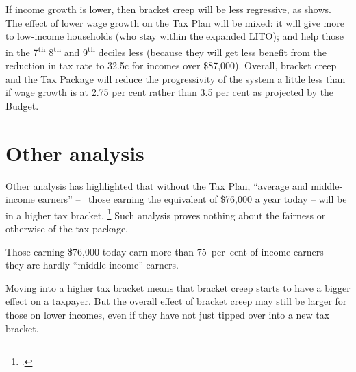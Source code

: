 \documentclass[submission]{grattan}
\begin{document}
If income growth is lower, then bracket creep will be less regressive, as  shows. The effect of lower wage growth on the Tax Plan will be mixed: it will give more to low-income households (who stay within the expanded LITO); and help those in the 7\textsuperscript{th} 8\textsuperscript{th} and 9\textsuperscript{th} deciles less (because they will get less benefit from the reduction in tax rate to 32.5c for incomes over \$87,000). Overall, bracket creep and the Tax Package will reduce the progressivity of the system a little less than if wage growth is at 2.75 per cent rather than 3.5 per cent as projected by the Budget.

\section{Other analysis}\label{sec:other-analysis}

Other analysis has highlighted that without the Tax Plan, ``average and middle-income earners'' -- \ie~those earning the equivalent of \$76,000 a year today -- will be in a higher tax bracket.
  \footcite{Benson}
Such analysis proves nothing about the fairness or otherwise of the tax package.

Those earning \$76,000 today earn more than 75~per~cent of income earners -- they are hardly ``middle income'' earners.

Moving into a higher tax bracket means that bracket creep starts to have a bigger effect on a taxpayer. But the overall effect of bracket creep may still be larger for those on lower incomes, even if they have not just tipped over into a new tax bracket.
\end{document}
